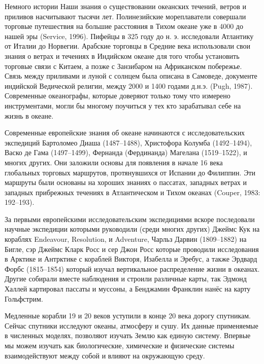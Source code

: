 
\begin{chapter}{Немного истории}
Наши знания о существовании океанских течений, ветров и приливов
насчитывают тысячи лет. Полинезийские мореплаватели совершали торговые
путешествия на большие расстояния в Тихом океане уже в 4000 до нашей
эры (Service, 1996). Пифейцы в 325 году до н. э. исследовали Атлантику
от Италии до Норвегии. Арабские торговцы в Средние века использовали
свои знания о ветрах и течениях в Индийском океане для того чтобы
установить торговые связи с Китаем, а позже с Занзибаром на
Африканском побережье. Связь между приливами и луной с солнцем была
описана в Самоведе, документе индийской Ведической религии, между 2000
и 1400 годами д.н.э. (Pugh, 1987). Современные океанографы, которые
доверяют только тому что измерено инструментами, могли бы многому
поучиться у тех кто зарабатывал себе на жизнь в океане.

Современные европейские знания об океане начинаются с
исследовательских экспедиций Бартоломео Диаша (1487--1488), Христофора
Колумба (1492--1494), Васко де Гама (1497--1499), Фернанда
(Фердинанда) Магелана (1519--1522), и многих других. Они заложили
основы для появления в начале 16 века глобальных торговых маршрутов,
протянувшихся от Испании до Филиппин. Эти маршруты были основаны на
хороших знаниях о пассатах, западных ветрах и западных прибрежных
течениях в Атлантическом и Тихом океанах (Couper, 1983: 192--193).

За первыми европейскими исследовательским экспедициями вскоре
последовали научные экспедиции которыми руководили (среди многих
других) Джеймс Кук на кораблях Endeavour, Resolution, и Adventure,
Чарльз Дарвин (1809--1882) на Бигле, сэр Джеймс Кларк Росс и сер
Джон Росс которые проводили исследования в Арктике и Антрктике с
кораблей Викторя, Изабелла и Эребус, а также Эрдвард Форбс
(1815--1854) который изучал вертикальное распределение жизни в
океанах. Другие собирали вместе наблюдения и строили различные карты,
так Эдмонд Халлей картировал пассаты и муссоны, а Бенджамин Франклин
нанёс на карту Гольфстрим.

Медленные корабли 19 и 20 веков уступили в конце 20 века дорогу
спутникам. Сейчас спутники исследуют океаны, атмосферу и сушу. Их
данные применяемые в численных моделях, позволяют изучать Землю как
единую систему. Впервые мы можем изучать как биологические, химические
и физические системы взаимодействуют между собой и влияют на
окружающую среду.



\end{chapter}
